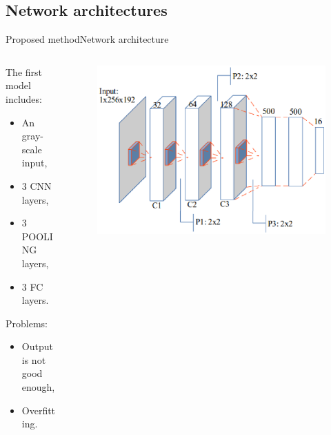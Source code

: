 \documentclass[10pt]{beamer}
\begin{document}
\subsection{Network architectures}
\begin{frame}{Proposed method}{Network architecture}
  \begin{columns}
		\begin{column}{0.45\textwidth}
			The first model includes: 
			\small{
			\begin{itemize}
				\item An gray-scale input,
    			\item $3$ CNN layers,
    			\item $3$ POOLING layers,
    			\item $3$ FC layers.
  			\end{itemize}}
  			Problems:
  			\small{
  			\begin{itemize}
  				\item Output is not good enough,
  				\item Overfitting.
  			\end{itemize}
  			}
		\end{column}
		\begin{column}{0.6\textwidth}  %
    		\begin{center}
     			\begin{figure}[htbp]
        			\centering
        			\includegraphics[scale=.4]{images/architecture1}
    				\label{figrsexample1}
				\end{figure}
     		\end{center}
		\end{column}
	\end{columns}~\\
\end{frame}
\end{document}
